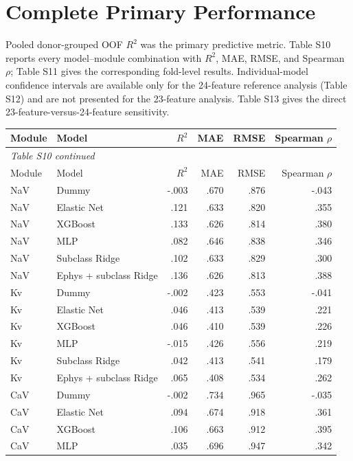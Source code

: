 \documentclass[11pt]{article}
\newcommand{\tablefont}{\fontsize{9.5}{11.2}\selectfont}
\newcommand{\sourcecaption}[1]{\Needspace{10\baselineskip}\vspace{2pt}{\small\bfseries #1}\par\vspace{2pt}}
\begin{document}
\section{Complete Primary Performance}
Pooled donor-grouped OOF $R^2$ was the primary predictive metric. Table S10 reports every model--module combination with $R^2$, MAE, RMSE, and Spearman $\rho$; Table S11 gives the corresponding fold-level results. Individual-model confidence intervals are available only for the 24-feature reference analysis (Table S12) and are not presented for the 23-feature analysis. Table S13 gives the direct 23-feature-versus-24-feature sensitivity.

{\tablefont
\sourcecaption{Complete pooled OOF performance for the 23-feature analysis (Table S10; $n=3,410$).}
\begin{longtable}{@{}llrrrr@{}}
\toprule
Module & Model & $R^2$ & MAE & RMSE & Spearman $\rho$ \\
\midrule
\endfirsthead
\multicolumn{6}{l}{\small\itshape Table S10 continued}\\[2pt]
\toprule
Module & Model & $R^2$ & MAE & RMSE & Spearman $\rho$ \\
\midrule
\endhead
NaV & Dummy & -.003 & .670 & .876 & -.043 \\
NaV & Elastic Net & .121 & .633 & .820 & .355 \\
NaV & XGBoost & .133 & .626 & .814 & .380 \\
NaV & MLP & .082 & .646 & .838 & .346 \\
NaV & Subclass Ridge & .102 & .633 & .829 & .300 \\
NaV & Ephys + subclass Ridge & .136 & .626 & .813 & .388 \\
Kv & Dummy & -.002 & .423 & .553 & -.041 \\
Kv & Elastic Net & .046 & .413 & .539 & .221 \\
Kv & XGBoost & .046 & .410 & .539 & .226 \\
Kv & MLP & -.015 & .426 & .556 & .219 \\
Kv & Subclass Ridge & .042 & .413 & .541 & .179 \\
Kv & Ephys + subclass Ridge & .065 & .408 & .534 & .262 \\
CaV & Dummy & -.002 & .734 & .965 & -.035 \\
CaV & Elastic Net & .094 & .674 & .918 & .361 \\
CaV & XGBoost & .106 & .663 & .912 & .395 \\
CaV & MLP & .035 & .696 & .947 & .342 \\

\end{longtable}}
\end{document}
